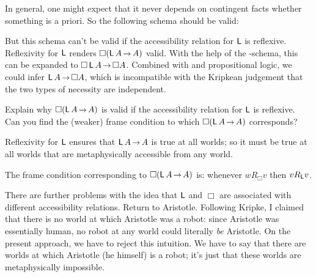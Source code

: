 In general,
one might expect that it never depends on contingent facts whether something is a priori.
So the following schema should be valid:
%
\begin{principles}
\end{principles}
%
But this schema can't be valid if the accessibility relation for $\operatorname{\mathsf{L}}$ is reflexive.
Reflexivity for $\operatorname{\mathsf{L}}$ renders $\Box (\apriori A \to A)$ valid.
With the help of the -schema,
this can be expanded to $\Box \apriori A \to \Box A$.
Combined with  and propositional logic,
we could infer $\apriori A \to \Box A$,
which is incompatible with the Kripkean judgement that the two types of necessity are independent.

\begin{exercise}
  Explain why $\Box(\apriori A \to A)$ is valid
  if the accessibility relation for $\operatorname{\mathsf{L}}$ is reflexive.
  Can you find the (weaker) frame condition to which $\Box (\apriori A \to A)$ corresponds?
\end{exercise}
\begin{solution}
  Reflexivity for $\operatorname{\mathsf{L}}$ ensures that $\apriori A \to A$ is true at all worlds;
  so it must be true at all worlds that are metaphysically accessible from any world.

  The frame condition corresponding to $\Box(\apriori A \to A)$ is:
  whenever $wR_{\Box}v$ then $vR_{\operatorname{\mathsf{L}}}v$.
\end{solution}


There are further problems with the idea that
$\operatorname{\mathsf{L}}$ and $\Box$ are associated with different accessibility relations.
Return to Aristotle.
Following Kripke,
I claimed that 
there is no world at which Aristotle was a robot:
since Aristotle was essentially human,
no robot at any world could literally \emph{be} Aristotle.
On the present approach,
we have to reject this intuition.
We have to say that there are worlds at which Aristotle (he himself) is a robot;
it's just that these worlds are metaphysically impossible.

